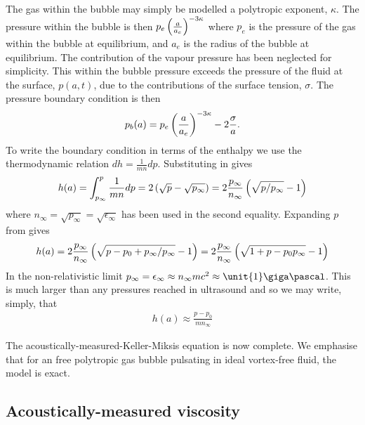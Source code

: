 The gas within the bubble may simply be modelled a polytropic exponent, $\kappa$. 
The pressure within the bubble is then $p_e \left( \frac{a}{a_e} \right)^{-3\kappa}$ where $p_e$ is the pressure of the gas within the bubble at equilibrium,
and $a_e$ is the radius of the bubble at equilibrium\cite{Hoff2001}.
The contribution of the vapour pressure has been neglected for simplicity.
This within the bubble pressure exceeds the pressure of the fluid at the surface, $p(a,t)$, due to the contributions of the surface tension, $\sigma$.
The pressure boundary condition is then
\begin{align}
  p_b(a) = p_e \left( \frac{a}{a_e} \right)^{-3\kappa} - 2\frac{\sigma}{a}. 
\end{align}
To write the boundary condition in terms of the enthalpy we use the  thermodynamic relation $d h = \frac{1}{m n} dp$.
Substituting in  gives
\begin{align}
  h(a) =  \int_{p_\infty}^{p}  \frac{1}{m n}dp = 2\left( \sqrt{p}-\sqrt{ p_\infty} \right) = 2 \frac{p_\infty}{n_\infty} \left( \sqrt{p/p_\infty} - 1 \right) 
\end{align}
where  $n_\infty = \sqrt{p_\infty} = \sqrt{\epsilon_\infty} $ has been used in the second equality.
Expanding $p$ from  gives
\begin{align}
  h(a) = 2 \frac{p_\infty}{n_\infty} \left( \sqrt{{p-p_0+p_\infty}/p_\infty} - 1 \right) =  2 \frac{p_\infty}{n_\infty} \left( \sqrt{1 + {p - p_0}{p_\infty}} - 1 \right)
\end{align}
In the non-relativistic limit $p_\infty = \epsilon_\infty \approx n_\infty m c^2 \approx \unit{1}\giga\pascal$\cite{Hoff2001}.
This is much larger than any pressures reached in ultrasound and so we may write, simply, that
\begin{align}
  h(a) \approx \frac{p - p_0}{mn_\infty}
\end{align}



The acoustically-measured-Keller-Miksis equation is now complete. 
We emphasise that for an free polytropic gas bubble pulsating in ideal vortex-free fluid, the model is exact.


\subsection{Acoustically-measured viscosity}\label{sec:viscosity}

